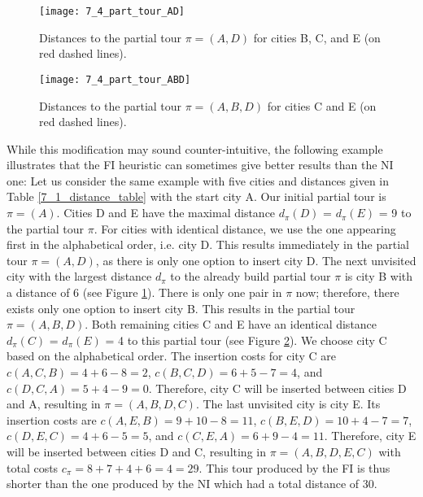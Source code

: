 \begin{figure}[htp] \centering
	\centering
	\texttt{[image: 7\_4\_part\_tour\_AD]}
	\caption{Distances to the partial tour $\pi = (A, D)$ for cities B, C, and E (on red dashed lines).}
	\label{7_4_part_tour_AD}
\end{figure}

\begin{figure}[htp] \centering
	\centering
	\texttt{[image: 7\_4\_part\_tour\_ABD]}
	\caption{Distances to the partial tour $\pi = (A, B, D)$ for cities C and E (on red dashed lines).}
	\label{7_4_part_tour_ABD}
\end{figure}

While this modification may sound counter-intuitive, the following example illustrates that the FI heuristic can sometimes give better results than the NI one: Let us consider the same example with five cities and distances given in Table \ref{7_1_distance_table} with the start city A. Our initial partial tour is $\pi = (A)$. Cities D and E have the maximal distance $d_{\pi}(D)$ = $d_{\pi}(E)$ = 9 to the partial tour $\pi$. For cities with identical distance, we use the one appearing first in the alphabetical order, i.e. city D. This results immediately in the partial tour $\pi = (A, D)$, as there is only one option to insert city D. The next unvisited city with the largest distance $d_{\pi}$ to the already build partial tour $\pi$ is city B with a distance of 6 (see Figure \ref{7_4_part_tour_AD}). There is only one pair in $\pi$ now; therefore, there exists only one option to insert city B. This results in the partial tour $\pi = (A, B, D)$. Both remaining cities C and E have an identical distance $d_{\pi}(C)$ = $d_{\pi}(E)$ = 4 to this partial tour (see Figure \ref{7_4_part_tour_ABD}). We choose city C based on the alphabetical order. The insertion costs for city C are $c(A, C, B) = 4 + 6 - 8 = 2$, $c(B, C, D)  = 6 + 5 - 7 = 4$, and $c(D, C, A) = 5 + 4 - 9 = 0$. Therefore, city C will be inserted between cities D and A, resulting in $\pi = (A, B, D, C)$. The last unvisited city is city E. Its insertion costs are $c(A, E, B) = 9 + 10 - 8 = 11$, $c(B, E, D) = 10 + 4 - 7 = 7$, $c(D, E, C)= 4 + 6 - 5 = 5$, and $c(C, E, A)  = 6 + 9 - 4 = 11$. Therefore, city E will be inserted between cities D and C, resulting in $\pi = (A, B, D, E, C)$ with total costs $c_{\pi} = 8 + 7 + 4 + 6 = 4 = 29$. This tour produced by the FI is thus shorter than the one produced by the NI which had a total distance of 30.\par 

